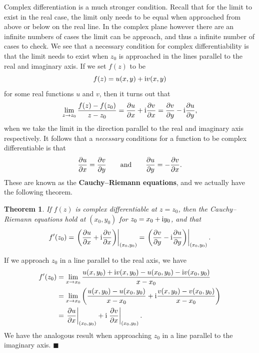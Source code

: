 \documentclass[letter-paper]{tufte-book}
\newtheorem{theorem}{\color{pastel-blue}Theorem}[section]
\newenvironment{proof}[1][Proof]{\begin{trivlist}
\item[\hskip \labelsep {\bfseries #1}]}{\end{trivlist}}
\newcommand{\dy}{\partial}
\newcommand{\ddy}[2]{\frac{\dy#1}{\dy#2}}
\newcommand{\zi}{{\rm i}}
\newcommand\Def[1]{\textbf{#1}}
\newcommand{\qed}{\hfill$\blacksquare$}
\begin{document}
Complex differentiation is a much stronger condition. Recall that for the limit
to exist in the real case, the limit only needs to be equal when approached from
above or below on the real line. In the complex plane however there are an
infinite numbers of cases the limit can be approach, and thus a infinite number
of cases to check. We see that a necessary condition for complex
differentiability is that the limit needs to exist when $z_0$ is approached in
the lines parallel to the real and imaginary axis. If we set $f(z)$ to be
\begin{equation*}
  f(z) = u(x,y) + \zi v(x,y)
\end{equation*}
for some real functions $u$ and $v$, then it turns out that
\begin{align*}
  \lim_{z \to z_0} \frac{f(z) - f(z_0)}{z - z_0} = \ddy{u}{x} + \zi \ddy{v}{x} = \ddy{v}{y} - \zi \ddy{u}{y},
\end{align*}
when we take the limit in the direction parallel to the real and imaginary axis
respectively. It follows that a \emph{necessary} conditions for a function to be
complex differentiable is that
\begin{equation}
  \ddy{u}{x} = \ddy{v}{y} \qquad \textnormal{and} \qquad \ddy{u}{y} = -\ddy{v}{x}.
\end{equation}
These are known as the \Def{Cauchy--Riemann equations}, and we actually have the
following theorem.
\begin{theorem}
  If $f(z)$ is complex differentiable at $z = z_0$, then the Cauchy--Riemann
  equations hold at $(x_0, y_0)$ for $z_0 = x_0 + \zi y_0$, and that
  \begin{equation*}
    f'(z_0) = \left.\left(\ddy{u}{x} + \zi \ddy{v}{x}\right)\right|_{(x_0, y_0)} = \left.\left(\ddy{v}{y} - \zi \ddy{u}{y}\right)\right|_{(x_0, y_0)}.
  \end{equation*}
\end{theorem}
\begin{proof}
  If we approach $z_0$ in a line parallel to the real axis, we have
  \begin{align*}
    f'(z_0) 
      &= \lim_{x \to x_0} \frac{u(x, y_0) + \zi v(x, y_0) - u(x_0, y_0) - \zi v(x_0, y_0)}{x - x_0}\\
      &= \lim_{x \to x_0} \left(\frac{u(x, y_0) - u(x_0, y_0)}{x - x_0} + \zi \frac{v(x, y_0) - v(x_0, y_0)}{x - x_0}\right)\\
      &= \left.\ddy{u}{x}\right|_{(x_0, y_0)} + \zi \left.\ddy{v}{x}\right|_{(x_0, y_0)}.
  \end{align*}
  We have the analogous result when approaching $z_0$ in a line parallel to the
  imaginary axis. \qed
\end{proof}
\end{document}
